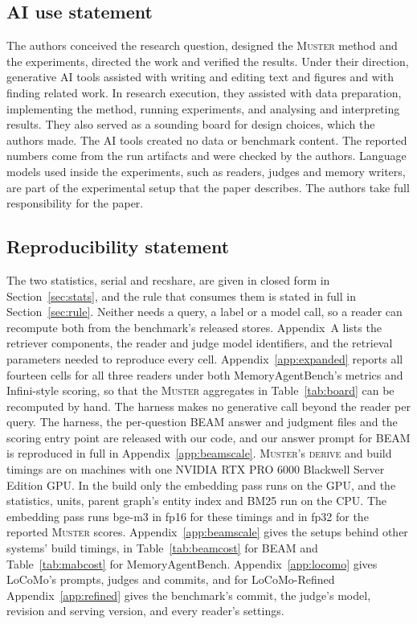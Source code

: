\documentclass{article}
\newcommand{\sys}{\textsc{Muster}}
\newcommand{\serial}{\textsf{serial}}
\newcommand{\cov}{\textsf{recshare}}
\begin{document}
\subsection*{AI use statement}

The authors conceived the research question, designed the \sys{} method and the experiments, directed the work and
verified the results. Under their direction, generative AI tools assisted with writing and editing text and figures
and with finding related work. In research execution, they assisted with data preparation, implementing the method,
running experiments, and analysing and interpreting results. They also served as a sounding board for design choices,
which the authors made. The AI tools created no data or benchmark content. The reported numbers come from the run
artifacts and were checked by the authors. Language models used inside the experiments, such as readers, judges and
memory writers, are part of the experimental setup that the paper describes. The authors take full responsibility
for the paper.

\subsection*{Reproducibility statement}

The two statistics, \serial{} and \cov{}, are given in closed form in Section~\ref{sec:stats}, and
the rule that consumes them is stated in full in Section~\ref{sec:rule}. Neither needs a query, a label
or a model call, so a reader can recompute both from the benchmark's released stores. Appendix~A lists
the retriever components, the reader and judge model identifiers, and the retrieval parameters needed to
reproduce every cell. Appendix~\ref{app:expanded} reports all fourteen cells for all three readers
under both MemoryAgentBench's metrics and Infini-style scoring, so that the \sys{} aggregates in Table~\ref{tab:board} can
be recomputed by hand. The harness makes no generative call beyond the reader per
query. The harness, the per-question BEAM answer and judgment files and the scoring entry point are released
with our code, and our answer prompt for BEAM is reproduced in full in
Appendix~\ref{app:beamscale}. \sys{}'s \textsc{derive} and build timings are on machines with one NVIDIA RTX PRO 6000 Blackwell Server Edition GPU. In the build only the embedding pass runs on the GPU, and the statistics, units, parent graph's entity index and BM25 run on the CPU. The embedding pass runs bge-m3 in fp16 for these timings and in fp32 for the reported \sys{} scores. Appendix~\ref{app:beamscale} gives the setups behind other systems' build timings, in Table~\ref{tab:beamcost} for BEAM and Table~\ref{tab:mabcost} for MemoryAgentBench. Appendix~\ref{app:locomo} gives LoCoMo's prompts, judges and commits, and for LoCoMo-Refined Appendix~\ref{app:refined} gives the benchmark's commit, the judge's model, revision and serving version, and every reader's settings.
\end{document}
